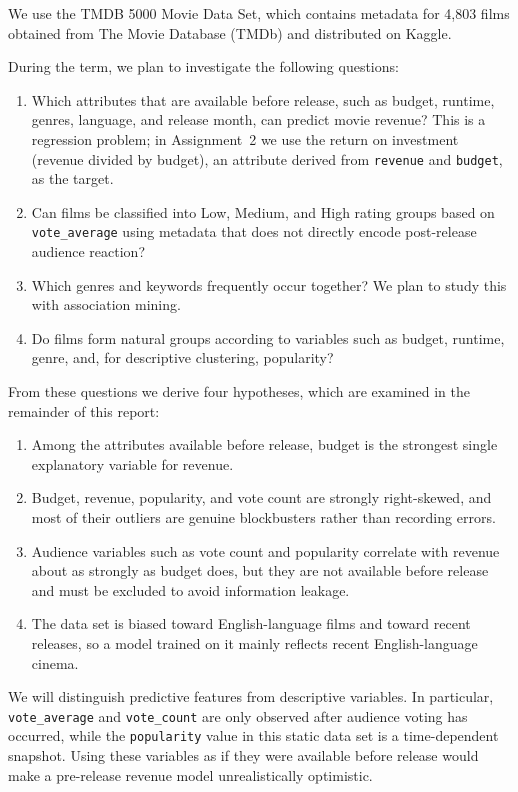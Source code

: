 \documentclass[conference]{IEEEtran}
\begin{document}
We use the TMDB 5000 Movie Data Set, which contains metadata for 4,803 films obtained from The Movie Database (TMDb) and distributed on Kaggle.

During the term, we plan to investigate the following questions:
\begin{enumerate}[leftmargin=*,nosep]
    \item Which attributes that are available before release, such as budget, runtime, genres, language, and release month, can predict movie revenue? This is a regression problem; in Assignment~2 we use the return on investment (revenue divided by budget), an attribute derived from \texttt{revenue} and \texttt{budget}, as the target.
    
    \item Can films be classified into Low, Medium, and High rating groups based on \texttt{vote\_average} using metadata that does not directly encode post-release audience reaction?
    \item Which genres and keywords frequently occur together? We plan to study this with association mining.
    \item Do films form natural groups according to variables such as budget, runtime, genre, and, for descriptive clustering, popularity?
\end{enumerate}
From these questions we derive four hypotheses, which are examined in the remainder of this report:
\begin{enumerate}[label=\textbf{H\arabic*.},leftmargin=*,nosep]
   \item Among the attributes available before release, budget is the strongest single explanatory variable for revenue.
    \item Budget, revenue, popularity, and vote count are strongly right-skewed, and most of their outliers are genuine blockbusters rather than recording errors.
   \item Audience variables such as vote count and popularity correlate with revenue about as strongly as budget does, but they are not available before release and must be excluded to avoid information leakage.
   \item The data set is biased toward English-language films and toward recent releases, so a model trained on it mainly reflects recent English-language cinema.
\end{enumerate}
We will distinguish predictive features from descriptive variables. In particular, \texttt{vote\_average} and \texttt{vote\_count} are only observed after audience voting has occurred, while the \texttt{popularity} value in this static data set is a time-dependent snapshot. Using these variables as if they were available before release would make a pre-release revenue model unrealistically optimistic.
\end{document}
